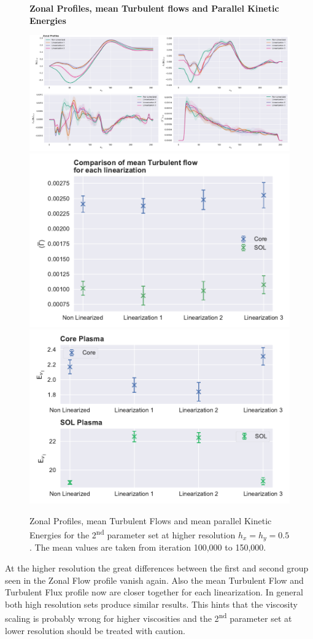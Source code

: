 \documentclass[master.tex]{subfiles}
\begin{document}
\begin{figure}[!hbtp]
    \textbf{Zonal Profiles, mean Turbulent flows and Parallel Kinetic Energies}\par\medskip
    \includegraphics[width=\linewidth]{pdfs/0-2_0-06/zonal_profiles_100000.pdf}
    \includegraphics[width=0.5\linewidth]{pdfs/0-2_0-06/turbulent_flow_means_100000.pdf}
    \includegraphics[width=0.5\linewidth]{pdfs/0-2_0-06/parallel_energies_100000.pdf}
    \caption{Zonal Profiles, mean Turbulent Flows and mean parallel Kinetic Energies for the 2\textsuperscript{nd} parameter set at higher resolution $h_x = h_y = 0.5$. The mean values are taken from iteration 100,000 to 150,000.}
    \label{fig:high-resoultion-set-2}
\end{figure}

At the higher resolution the great differences between the first and second group seen in the Zonal Flow profile vanish again. Also the mean Turbulent Flow and Turbulent Flux profile now are closer together for each linearization. In general both high resolution sets produce similar results. This hints that the viscosity scaling is probably wrong for higher viscosities and the 2\textsuperscript{nd} parameter set at lower resolution should be treated with caution.  
\end{document}
